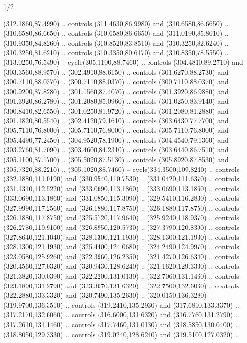\begin{flagdescription}{1/2}
\begin{scope}[xshift=0.5\flaglength]
\begin{scope}[scale=0.004\flagwidth,xshift=-90mm,yshift=89mm]
\begin{scope}[y=0.80pt, x=0.80pt, yscale=-1, xscale=1, inner sep=0pt, outer sep=0pt]
  (312.1860,87.4990) .. controls (311.4630,86.9980) and (310.6580,86.6650) ..
  (310.6580,86.6650) .. controls (310.6580,86.6650) and (311.0190,85.8010) ..
  (310.9350,84.8260) .. controls (310.8520,83.8510) and (310.3250,82.6240) ..
  (310.3250,81.6210) .. controls (310.3350,80.6170) and (310.8350,78.5550) ..
  (313.0250,76.5490) -- cycle(305.1100,88.7460) .. controls (304.4810,89.2710)
  and (303.3560,88.9570) .. (302.4910,88.6150) .. controls (301.6270,88.2730)
  and (300.7110,88.0370) .. (300.7110,88.0370) .. controls (300.7110,88.0370)
  and (300.9200,87.8280) .. (301.1560,87.4070) .. controls (301.3920,86.9880)
  and (301.3920,86.2780) .. (301.2080,85.0960) .. controls (301.0250,83.9140)
  and (300.8410,82.6550) .. (301.0250,81.9720) .. controls (301.2080,81.2880)
  and (301.1820,80.5540) .. (302.4120,79.1610) .. controls (303.6430,77.7700)
  and (305.7110,76.8000) .. (305.7110,76.8000) .. controls (305.7110,76.8000)
  and (305.4490,77.2450) .. (304.9520,78.1900) .. controls (304.4540,79.1360)
  and (303.2760,81.7090) .. (303.4600,84.2310) .. controls (303.6440,86.7510)
  and (305.1100,87.1700) .. (305.5020,87.5130) .. controls (305.8920,87.8530)
  and (305.7320,88.2210) .. (305.1020,88.7460) -- cycle(334.3500,109.8240) ..
  controls (332.1880,111.0190) and (330.9540,110.7530) .. (331.0420,111.6370) ..
  controls (331.1310,112.5220) and (333.0690,113.1860) .. (333.0690,113.1860) ..
  controls (333.0690,113.1860) and (331.0850,115.3090) .. (329.5410,116.2830) ..
  controls (327.9990,117.2560) and (326.1880,117.8750) .. (326.1880,117.8750) ..
  controls (326.1880,117.8750) and (325.5720,117.9640) .. (325.9240,118.9370) ..
  controls (326.2780,119.9100) and (326.8950,120.5730) .. (327.3790,120.8390) ..
  controls (327.8640,121.1040) and (328.1300,121.1930) .. (328.1300,121.1930) ..
  controls (328.1300,121.1930) and (325.4400,124.0680) .. (324.2490,124.9970) ..
  controls (323.0580,125.9260) and (322.3960,126.2350) .. (321.4270,126.6340) ..
  controls (320.4560,127.0320) and (320.9430,128.6240) .. (321.1620,129.3330) ..
  controls (321.3820,130.0390) and (322.2200,131.0130) .. (322.7060,131.1460) ..
  controls (323.1890,131.2790) and (323.3670,131.6320) .. (322.7500,132.6060) ..
  controls (322.2880,133.3320) and (320.7490,135.2630) .. (320.0150,136.3280) --
  (319.9700,136.3510) .. controls (319.2410,135.2930) and (317.6810,133.3370) ..
  (317.2170,132.6060) .. controls (316.6000,131.6320) and (316.7760,131.2790) ..
  (317.2610,131.1460) .. controls (317.7460,131.0130) and (318.5850,130.0400) ..
  (318.8050,129.3330) .. controls (319.0240,128.6240) and (319.5100,127.0320) ..

\end{scope}
\end{scope}
\end{scope}
\end{flagdescription}

